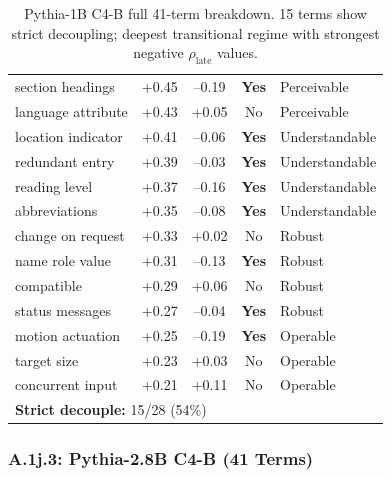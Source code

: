 \documentclass[10pt]{article} %
\begin{document}
\begin{table}[H]
\begin{tabular}{|l|c|c|c|l|}
section headings & +0.45 & --0.19 & \textbf{Yes} & Perceivable \\
language attribute & +0.43 & +0.05 & No & Perceivable \\
location indicator & +0.41 & --0.06 & \textbf{Yes} & Understandable \\
redundant entry & +0.39 & --0.03 & \textbf{Yes} & Understandable \\
reading level & +0.37 & --0.16 & \textbf{Yes} & Understandable \\
abbreviations & +0.35 & --0.08 & \textbf{Yes} & Understandable \\
change on request & +0.33 & +0.02 & No & Robust \\
name role value & +0.31 & --0.13 & \textbf{Yes} & Robust \\
compatible & +0.29 & +0.06 & No & Robust \\
status messages & +0.27 & --0.04 & \textbf{Yes} & Robust \\
motion actuation & +0.25 & --0.19 & \textbf{Yes} & Operable \\
target size & +0.23 & +0.03 & No & Operable \\
concurrent input & +0.21 & +0.11 & No & Operable \\
\hline
\multicolumn{4}{|l|}{\textbf{Strict decouple:} 15/28 (54\%)} \\
\hline
\end{tabular}
\caption{Pythia-1B C4-B full 41-term breakdown. 15 terms show strict decoupling; deepest transitional regime with strongest negative $\rho_\text{late}$ values.}
\end{table}

\subsubsection*{A.1j.3: Pythia-2.8B C4-B (41 Terms)}
\end{document}
